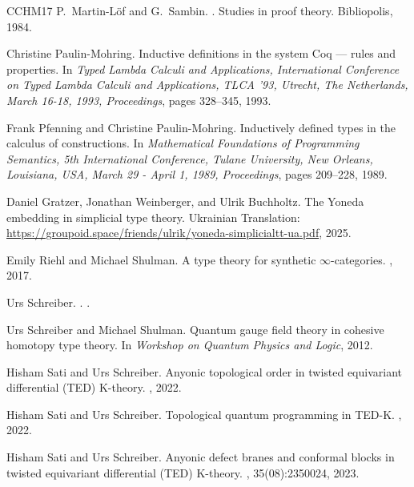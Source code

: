 \documentclass{article}
\theoremstyle{definition}
\theoremstyle{plain}
\begin{document}
\begin{thebibliography}{CCHM17}
P.~Martin-L{\"o}f and G.~Sambin.
.
\newblock Studies in proof theory. Bibliopolis, 1984.

Christine Paulin{-}Mohring.
\newblock Inductive definitions in the system {C}oq --- rules and properties.
\newblock In {\em Typed Lambda Calculi and Applications, International
  Conference on Typed Lambda Calculi and Applications, {TLCA} '93, Utrecht, The
  Netherlands, March 16-18, 1993, Proceedings}, pages 328--345, 1993.

Frank Pfenning and Christine Paulin{-}Mohring.
\newblock Inductively defined types in the calculus of constructions.
\newblock In {\em Mathematical Foundations of Programming Semantics, 5th
  International Conference, Tulane University, New Orleans, Louisiana, USA,
  March 29 - April 1, 1989, Proceedings}, pages 209--228, 1989.

Daniel Gratzer, Jonathan Weinberger, and Ulrik Buchholtz.
\newblock The Yoneda embedding in simplicial type theory.
\newblock Ukrainian Translation: \url{https://groupoid.space/friends/ulrik/yoneda-simplicialtt-ua.pdf}, 2025.

Emily Riehl and Michael Shulman.
\newblock A type theory for synthetic $\infty$-categories.
, 2017.

Urs Schreiber.
.
.

Urs Schreiber and Michael Shulman.
\newblock Quantum gauge field theory in cohesive homotopy type theory.
\newblock In {\em Workshop on Quantum Physics and Logic}, 2012.

Hisham Sati and Urs Schreiber.
\newblock Anyonic topological order in twisted equivariant differential (TED) K-theory.
, 2022.

Hisham Sati and Urs Schreiber.
\newblock Topological quantum programming in TED-K.
, 2022.

Hisham Sati and Urs Schreiber.
\newblock Anyonic defect branes and conformal blocks in twisted equivariant differential (TED) K-theory.
, 35(08):2350024, 2023.

\end{thebibliography}
\end{document}
